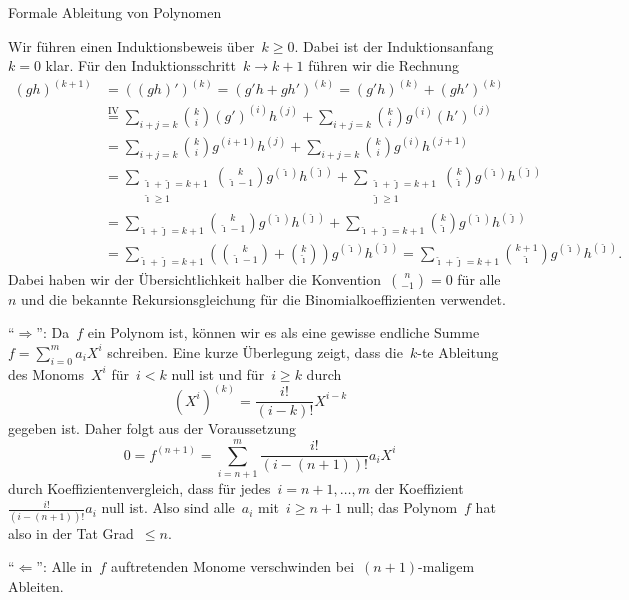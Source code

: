 \documentclass{algblatt}
\begin{document}
\begin{aufgabe}{Formale Ableitung von Polynomen}
\begin{loesungE}
\item Wir führen einen Induktionsbeweis über~$k \geq 0$.
Dabei ist der Induktionsanfang~$k = 0$ klar. Für den Induktionsschritt~$k \to k
+ 1$ führen wir die Rechnung
\begin{align*}
  (gh)^{(k+1)} &=
  ((gh)')^{(k)} = (g'h + gh')^{(k)} = (g'h)^{(k)} + (gh')^{(k)} \\
  &\stackrel{\text{IV}}{=}
    \sum_{i+j=k} \binom{k}{i} (g')^{(i)} h^{(j)} +
    \sum_{i+j=k} \binom{k}{i} g^{(i)} (h')^{(j)} \\
  &=
    \sum_{i+j=k} \binom{k}{i} g^{(i+1)} h^{(j)} +
    \sum_{i+j=k} \binom{k}{i} g^{(i)} h^{(j+1)} \\
  &=
    \sum_{\substack{\hat\imath+\hat\jmath=k+1\\\hat\imath\geq1}} \binom{k}{\hat\imath - 1} g^{(\hat\imath)} h^{(\hat\jmath)} +
    \sum_{\substack{\hat\imath+\hat\jmath=k+1\\\hat\jmath\geq1}} \binom{k}{\hat\imath} g^{(\hat\imath)} h^{(\hat\jmath)} \\
  &=
    \sum_{\hat\imath+\hat\jmath=k+1} \binom{k}{\hat\imath - 1} g^{(\hat\imath)} h^{(\hat\jmath)} +
    \sum_{\hat\imath+\hat\jmath=k+1} \binom{k}{\hat\imath} g^{(\hat\imath)} h^{(\hat\jmath)} \\
  &= \sum_{\hat\imath+\hat\jmath=k+1}
    \left(\binom{k}{\hat\imath - 1} + \binom{k}{\hat\imath}\right) g^{(\hat\imath)} h^{(\hat\jmath)}
  = \sum_{\hat\imath+\hat\jmath=k+1}
    \binom{k+1}{\hat\imath} g^{(\hat\imath)} h^{(\hat\jmath)}.
\end{align*}
Dabei haben wir der Übersichtlichkeit halber die Konvention~$\binom{n}{-1} = 0$
für alle~$n$ und die bekannte Rekursionsgleichung für die Binomialkoeffizienten
verwendet.

\item "`$\Longrightarrow$"': Da~$f$ ein Polynom ist, können wir es als eine gewisse
endliche Summe~$f = \sum_{i=0}^m a_i X^i$ schreiben. Eine kurze Überlegung
zeigt, dass die~$k$-te Ableitung des Monoms~$X^i$ für~$i < k$ null ist und
für~$i \geq k$ durch
\[ (X^i)^{(k)} = \frac{i!}{(i-k)!} X^{i-k} \]
gegeben ist. Daher folgt aus der Voraussetzung
\[ 0 = f^{(n+1)} = \sum_{i=n+1}^m \frac{i!}{(i-(n+1))!} a_i X^i \]
durch Koeffizientenvergleich, dass für jedes~$i = n+1,\ldots,m$ der
Koeffizient~$\frac{i!}{(i-(n+1))!} a_i$ null ist. Also sind alle~$a_i$ mit~$i
\geq n+1$ null; das Polynom~$f$ hat also in der Tat Grad~$\leq n$.

"`$\Longleftarrow$"': Alle in~$f$ auftretenden Monome verschwinden bei~$(n+1)$-maligem Ableiten.


\end{loesungE}
\end{aufgabe}
\end{document}
